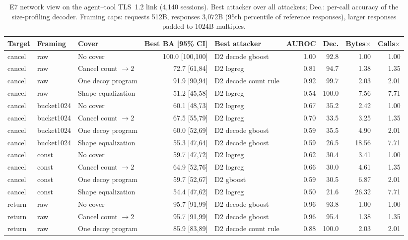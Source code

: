 \begin{table}[!ht]\centering\scriptsize
\caption{E7 network view on the agent--tool TLS~1.2 link (4,140 sessions). Best attacker over all attackers; Dec.: per-call accuracy of the size-profiling decoder. Framing caps: requests 512B, responses 3,072B (95th percentile of reference responses), larger responses padded to 1024B multiples.}
\begin{tabular}{@{}lllrlrrrr@{}}\toprule
Target & Framing & Cover & Best BA [95\% CI] & Best attacker & AUROC & Dec. & Bytes$\times$ & Calls$\times$\\\midrule
cancel & raw & No cover & 100.0 [100,100] & D2 decode gboost & 1.00 & 92.8 & 1.00 & 1.00\\
cancel & raw & Cancel count $\to 2$ & 72.7 [61,84] & D2 logreg & 0.81 & 94.7 & 1.38 & 1.35\\
cancel & raw & One decoy program & 91.9 [90,94] & D2 decode count rule & 0.92 & 99.7 & 2.03 & 2.01\\
cancel & raw & Shape equalization & 51.2 [45,58] & D2 logreg & 0.54 & 100.0 & 7.56 & 7.71\\
cancel & bucket1024 & No cover & 60.1 [48,73] & D2 logreg & 0.67 & 35.2 & 2.42 & 1.00\\
cancel & bucket1024 & Cancel count $\to 2$ & 67.5 [55,79] & D2 logreg & 0.70 & 33.5 & 3.25 & 1.35\\
cancel & bucket1024 & One decoy program & 60.0 [52,69] & D2 decode gboost & 0.59 & 35.5 & 4.90 & 2.01\\
cancel & bucket1024 & Shape equalization & 55.3 [47,64] & D2 decode gboost & 0.59 & 26.5 & 18.56 & 7.71\\
cancel & const & No cover & 59.7 [47,72] & D2 logreg & 0.62 & 30.4 & 3.41 & 1.00\\
cancel & const & Cancel count $\to 2$ & 64.9 [52,76] & D2 logreg & 0.66 & 30.0 & 4.61 & 1.35\\
cancel & const & One decoy program & 59.7 [52,67] & D2 gboost & 0.59 & 30.5 & 6.87 & 2.01\\
cancel & const & Shape equalization & 54.4 [47,62] & D2 logreg & 0.50 & 21.6 & 26.32 & 7.71\\
return & raw & No cover & 95.7 [91,99] & D2 decode gboost & 0.96 & 93.8 & 1.00 & 1.00\\
return & raw & Cancel count $\to 2$ & 95.7 [91,99] & D2 decode gboost & 0.96 & 95.4 & 1.38 & 1.35\\
return & raw & One decoy program & 85.9 [83,89] & D2 decode count rule & 0.88 & 100.0 & 2.03 & 2.01\\

\end{tabular}
\end{table}
